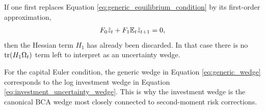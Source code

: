 If one first replaces Equation \eqref{eq:generic_equilibrium_condition} by its
first-order approximation,
\begin{equation}
    F_0 \tilde{z}_t
    +
    F_1 \mathbb{E}_t\tilde{z}_{t+1}
    =
    0,
    \label{eq:first_order_discard}
\end{equation}
then the Hessian term \(H_1\) has already been discarded. In that case there is
no \(\operatorname{tr}(H_1\Omega_t)\) term left to interpret as an uncertainty wedge.

For the capital Euler condition, the generic wedge in Equation
\eqref{eq:generic_wedge} corresponds to the log investment wedge in Equation
\eqref{eq:investment_uncertainty_wedge}. This is why the investment wedge is the
canonical BCA wedge most closely connected to second-moment risk corrections.
